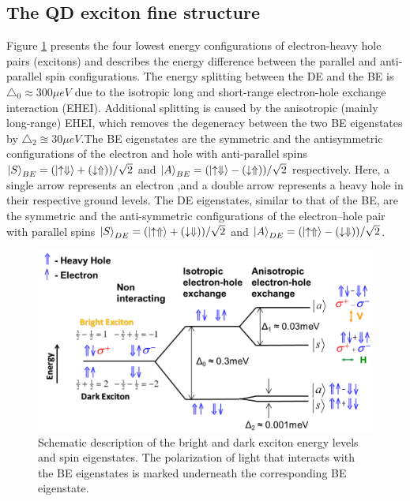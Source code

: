 \subsection{The QD exciton fine structure}
Figure \ref{fig:energy_structure}  presents the four lowest energy configurations of electron-heavy hole pairs (excitons) and describes the energy difference between the parallel and anti-parallel spin configurations. The energy splitting between the DE and the BE is $\triangle_0 \approx 300 \mu eV$ due to the isotropic long and short-range electron-hole exchange interaction (EHEI). Additional splitting is caused by the anisotropic (mainly long-range) EHEI, which removes the degeneracy between the two BE eigenstates by $\triangle_2 \approxeq 30 \mu eV $.The BE eigenstates are the symmetric and the antisymmetric configurations of the electron and hole with anti-parallel spins $ \ket{S}_{BE} = (\ket{\uparrow\Downarrow}+(\downarrow\Uparrow))/\sqrt{2}$ and  $ \ket{A}_{BE} = (\ket{\uparrow\Downarrow}-(\downarrow\Uparrow))/\sqrt{2}$ respectively. Here, a single arrow represents an electron ,and a double arrow represents a heavy hole in their respective ground levels. The DE eigenstates, similar to that of the BE, are the symmetric and the anti-symmetric configurations of the electron–hole pair with parallel spins $ \ket{S}_{DE} = (\ket{\uparrow\Uparrow}+(\downarrow\Downarrow))/\sqrt{2}$ and $ \ket{A}_{DE} = (\ket{\uparrow\Uparrow}-(\downarrow\Downarrow))/\sqrt{2}$.
\begin{figure}[H]
	\centering
	\includegraphics[scale=0.32]{figures/energy_structure.png}
	\caption{Schematic description of the bright and dark exciton energy levels and spin eigenstates. The polarization of light that interacts with the BE eigenstates is marked underneath the corresponding BE eigenstate.}
	\label{fig:energy_structure}
\end{figure}
